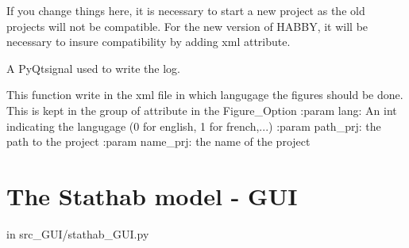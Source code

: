 \documentclass[letterpaper,10pt,english]{sphinxmanual}
\begin{document}
\begin{fulllineitems}
\begin{fulllineitems}
If you change things here, it is necessary to start a new project as the old projects will not be compatible.
For the new version of HABBY, it will be necessary to insure compatibility by adding xml attribute.

\end{fulllineitems}


\begin{fulllineitems}
\label{\detokenize{index:src_GUI.output_fig_GUI.PreferenceWindow.send_log}}
A PyQtsignal used to write the log.

\end{fulllineitems}


\end{fulllineitems}


\begin{fulllineitems}
\label{\detokenize{index:src_GUI.output_fig_GUI.set_lang_fig}}
This function write in the xml file in which langugage the figures should be done. This is kept in the
group of attribute in the Figure\_Option
:param lang: An int indicating the langugage (0 for english, 1 for french,...)
:param path\_prj: the path to the project
:param name\_prj: the name of the project

\end{fulllineitems}



\section{The Stathab model - GUI}
\label{\detokenize{index:the-stathab-model-gui}}
in src\_GUI/stathab\_GUI.py
\label{\detokenize{index:module-src_GUI.stathab_GUI}}
\end{document}
